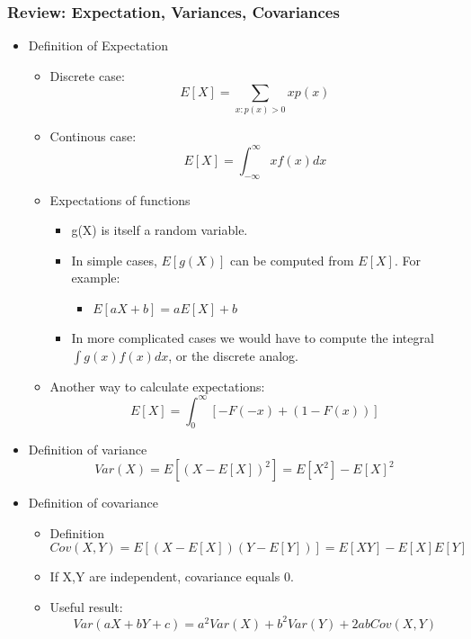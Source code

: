 \documentclass[12pt]{report}
\begin{document}
\subsubsection*{Review: Expectation, Variances, Covariances}
\label{sec-1-1-5}
\begin{itemize}
\item Definition of Expectation
\label{sec-1-1-5-1}
\begin{itemize}
\item Discrete case:
\label{sec-1-1-5-1-1}
$$E[X]=\sum_{x:p(x)>0} x p(x)$$
\item Continous case:
\label{sec-1-1-5-1-2}
$$E[X]=\int_{-\infty}^{\infty}x f(x) dx $$
\item Expectations of functions
\label{sec-1-1-5-1-3}
\begin{itemize}
\item g(X) is itself a random variable.
\item In simple cases, $E[g(X)]$ can be computed
from $E[X]$.  For example:
\begin{itemize}
\item $E[aX+b]=aE[X]+b$
\end{itemize}
\item In more complicated cases we would have to compute the integral $\int g(x)f(x)dx$, or the discrete analog.
\end{itemize}
\item Another way to calculate expectations:
$$ E[X] = \int^{\infty}_0[-F(-x)+(1-F(x))]$$
\end{itemize}
\item Definition of variance
\label{sec-1-1-5-2}
$$ Var(X)=E[(X-E[X])^2]=E[X^2]-E[X]^2$$
\item Definition of covariance
\label{sec-1-1-5-3}
\begin{itemize}
\item Definition$$ Cov(X,Y)=E[(X-E[X])(Y-E[Y])]=E[XY]-E[X]E[Y]$$
\item If X,Y are independent, covariance equals 0.
\item Useful result: $$Var(aX+bY+c)=a^2 Var(X)+b^2 Var(Y)+2ab Cov(X,Y)$$
\end{itemize}
\end{itemize}
\end{document}
